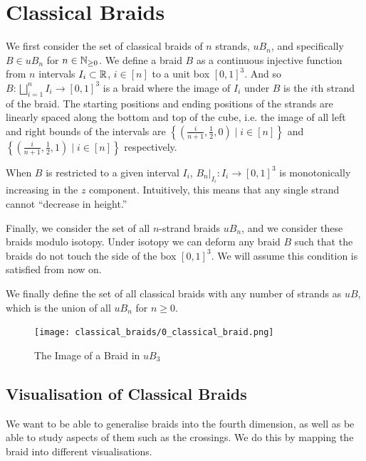 
\chapter{Classical Braids}

We first consider the set of classical braids of \( n \) strands, \( \mathit{uB}_n \), and specifically \( B \in \mathit{uB}_n \) for \( n \in \mathbb{N}_{\ge 0} \). 
We define a braid \( B \) as a continuous injective function from \( n \) intervals \( I_i \subset \mathbb{R} \), \( i \in [n] \)  to a unit box \( [0, 1]^3 \). 
And so \( B : \bigsqcup_{i = 1}^n I_i \rightarrow [0, 1]^3 \) is a braid where the image of \( I_i \) under \( B \) is the \( i \)th strand of the braid. 
The starting positions and ending positions of the strands are linearly spaced along the bottom and top of the cube, i.e. the image of all left and right bounds of the intervals are \( \left\{ \left(\frac{i}{n + 1}, \frac{1}{2} , 0 \right) \mid i \in [n] \right\} \) and \( \left\{ \left(\frac{i}{n + 1}, \frac{1}{2} , 1 \right) \mid i \in [n] \right\} \) respectively. 

When \( B \) is restricted to a given interval \( I_i \), \( B_n |_{I_i} : I_i \rightarrow [0, 1]^3 \) is monotonically increasing in the \( z \) component. 
Intuitively, this means that any single strand cannot ``decrease in height.''

Finally, we consider the set of all \( n \)-strand braids \( \mathit{uB}_n \), and we consider these braids modulo isotopy.
Under isotopy we can deform any braid \( B \) such that the braids do not touch the side of the box \( [0, 1]^3 \). We will assume this condition is satisfied from now on. 

We finally define the set of all classical braids with any number of strands as \( \mathit{uB} \), which is the union of all \( uB_n \) for \( n \ge 0 \).

\begin{figure}[H]
    \centering
    \texttt{[image: classical\_braids/0\_classical\_braid.png]}
    \caption{The Image of a Braid in \( uB_3 \)}
    \label{fig:classical_braid}
\end{figure}

\section{Visualisation of Classical Braids}

We want to be able to generalise braids into the fourth dimension, as well as be able to study aspects of them such as the crossings. 
We do this by mapping the braid into different visualisations. 

